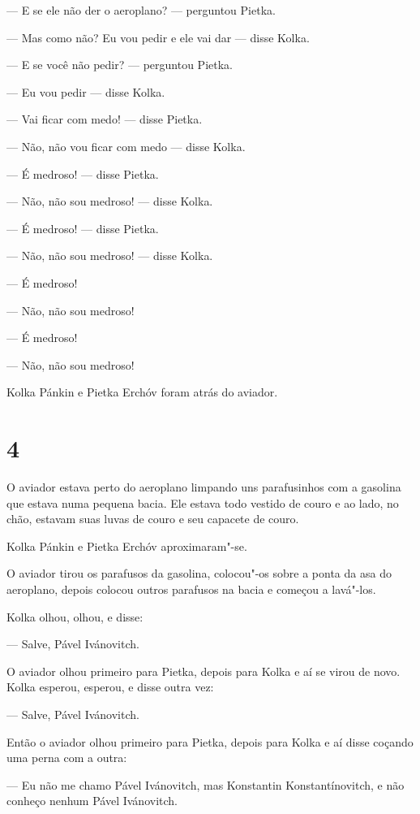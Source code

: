 --- E se ele não der o aeroplano? --- perguntou Pietka.

--- Mas como não? Eu vou pedir e ele vai dar --- disse Kolka.

--- E se você não pedir? --- perguntou Pietka.

--- Eu vou pedir --- disse Kolka.

--- Vai ficar com medo! --- disse Pietka.

--- Não, não vou ficar com medo --- disse Kolka.

--- É medroso! --- disse Pietka.

--- Não, não sou medroso! --- disse Kolka.

--- É medroso! --- disse Pietka.

--- Não, não sou medroso! --- disse Kolka.

--- É medroso!

--- Não, não sou medroso!

--- É medroso!

--- Não, não sou medroso!

Kolka Pánkin e Pietka Erchóv foram atrás do aviador.

\section{4}

O aviador estava perto do aeroplano limpando uns parafusi­nhos com a
gasolina que estava numa pequena bacia. Ele estava todo vestido de couro
e ao lado, no chão, estavam suas luvas de couro e seu capacete de couro.

Kolka Pánkin e Pietka Erchóv aproximaram"-se.

O aviador tirou os parafusos da gasolina, colocou"-os sobre a ponta da
asa do aeroplano, depois colocou outros parafusos na bacia e começou a
lavá"-los.

Kolka olhou, olhou, e disse:

--- Salve, Pável Ivánovitch.

O aviador olhou primeiro para Pietka, depois para Kolka e aí se virou de
novo. Kolka esperou, esperou, e disse outra vez:

--- Salve, Pável Ivánovitch.

Então o aviador olhou primeiro para Pietka, depois para Kolka e aí disse
coçando uma perna com a outra:

--- Eu não me chamo Pável Ivánovitch, mas Konstantin Konstantínovitch, e
não conheço nenhum Pável Ivánovitch.

